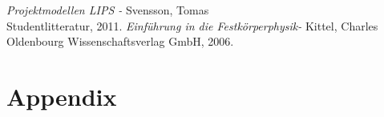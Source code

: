 \documentclass[a4paper,12pt]{article}
\begin{document}
% 
\newpage

\begin{thebibliography}{99}
\textit{Projektmodellen LIPS - } Svensson, Tomas
\\Studentlitteratur, 2011.
\textit{Einführung in die Festkörperphysik- } Kittel, Charles
\\Oldenbourg Wissenschaftsverlag GmbH, 2006.
\end{thebibliography}
\newpage
\appendix
\section{Appendix}
\label{LetterOA}

\subsection{}
\end{document}
